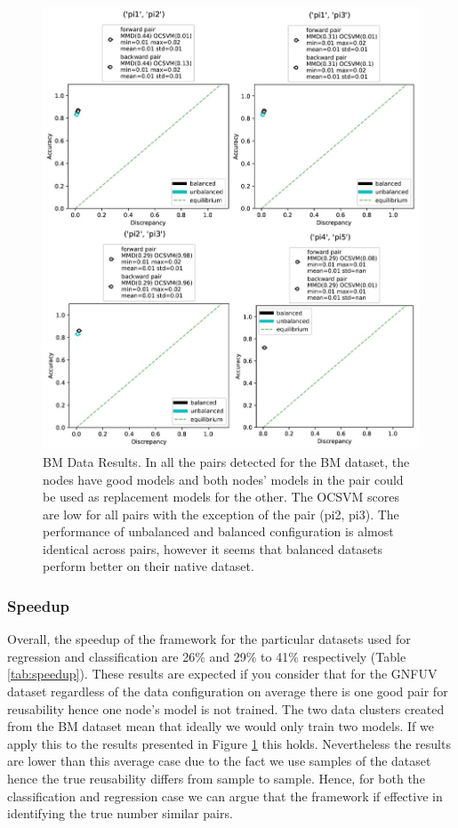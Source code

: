 \documentclass{mpaper}
\begin{document}
\begin{figure}
    \centering
    \includegraphics[scale= 0.47]{bm_results.JPG}
    \caption{BM Data Results. In all the pairs detected for the BM dataset, the nodes have good models and both nodes' models in the pair could be used as replacement models for the other. The OCSVM scores are low for all pairs with the exception of the pair (pi2, pi3). The performance of unbalanced and balanced configuration is almost identical across pairs, however it seems that balanced datasets perform better on their native dataset.}
    \label{fig:bm_results}
\end{figure}


\subsubsection{Speedup}

Overall, the speedup of the framework for the particular datasets used for regression and classification are 26\% and 29\% to 41\% respectively (Table \ref{tab:speedup}). These results are expected if you consider that for the GNFUV dataset regardless of the data configuration on average there is one good pair for reusability hence one node's model is not trained. The two data clusters created from the BM dataset mean that ideally we would only train two models. If we apply this to the results presented in Figure \ref{fig:bm_results} this holds. Nevertheless the results are lower than this average case due to the fact we use samples of the dataset hence the true reusability differs from sample to sample. Hence, for both the classification and regression case we can argue that the framework if effective in identifying the true number similar pairs. 
\end{document}
